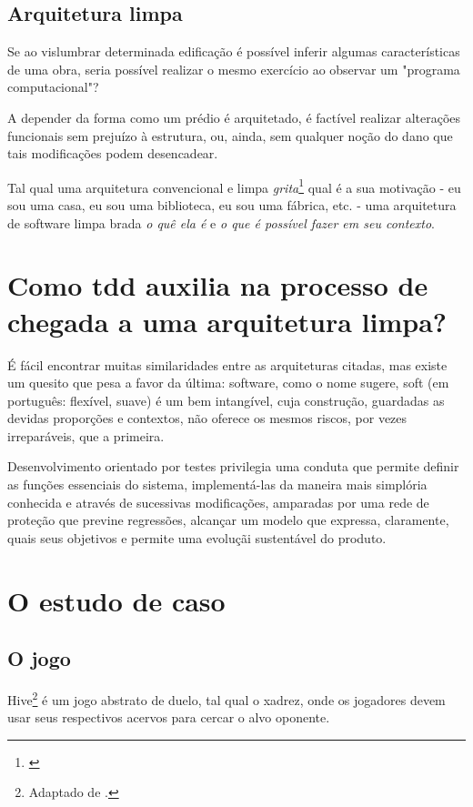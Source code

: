   \subsection{Arquitetura limpa}

    Se ao vislumbrar determinada edificação é possível inferir algumas características de uma obra, seria possível realizar o mesmo exercício ao observar um "programa computacional"?

    A depender da forma como um prédio é arquitetado, é factível realizar alterações funcionais sem prejuízo à estrutura, ou, ainda, sem qualquer noção do dano que tais modificações podem desencadear.

    Tal qual uma arquitetura convencional e limpa \emph{grita}\footnote{\cite[p. 196]{ Martin2018}} qual é a sua motivação - eu sou uma casa, eu sou uma biblioteca, eu sou uma fábrica, etc. - uma arquitetura de software limpa brada \emph{o quê ela é} e \emph{o que é possível fazer em seu contexto}.

\section{Como tdd auxilia na processo de chegada a uma arquitetura limpa?}

  É fácil encontrar muitas similaridades entre as arquiteturas citadas, mas existe um quesito que pesa a favor da última: software, como o nome sugere, soft (em português: flexível, suave) é um bem intangível, cuja construção, guardadas as devidas proporções e contextos, não oferece os mesmos riscos, por vezes irreparáveis, que a primeira.

  Desenvolvimento orientado por testes privilegia uma conduta que permite definir as funções essenciais do sistema, implementá-las da maneira mais simplória conhecida e através de sucessivas modificações, amparadas por uma rede de proteção que previne regressões, alcançar um modelo que expressa, claramente, quais seus objetivos e permite uma evoluçãi sustentável do produto.

\section{O estudo de caso}

  \subsection{O jogo}

    Hive\footnote{Adaptado de \cite{UltraBoardGames2020}.} é um jogo abstrato de duelo, tal qual o xadrez, onde os jogadores devem usar seus respectivos acervos para cercar o alvo oponente.

